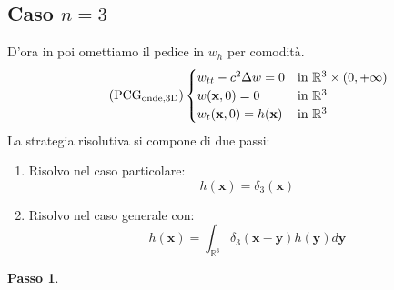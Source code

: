 \documentclass[10pt,a4paper,twoside,openright]{book}
\newcommand{\x}{\mathbf{x}}
\newcommand{\y}{\mathbf{y}}
\begin{document}
\subsection{Caso \texorpdfstring{$n=3$}{n=3}}

D'ora in poi omettiamo il pedice in $\displaystyle w_{h}$ per comodità.
\begin{equation*}
	\tag{PCG$_{\text{onde,3D}}$}
	\begin{cases}
		w_{tt} -c^{2} \Delta w=0            & \text{in} \ \mathbb{R}^{3} \times ( 0,+\infty ) \\
		w(\x ,0) =0                 & \text{in} \ \mathbb{R}^{3}                      \\
		w_{t}(\x ,0) =h(\x) & \text{in} \ \mathbb{R}^{3}                      
	\end{cases}
	\label{eq:pcg-3-onde}
\end{equation*}
La strategia risolutiva si compone di due passi:
\begin{enumerate}
	\item Risolvo nel caso particolare:
		\begin{equation*}
			h(\x) =\delta _{3}(\x)
		\end{equation*}
	\item Risolvo nel caso generale con:
		\begin{equation*}
			h(\x) =\int _{\mathbb{R}^{3}} \delta _{3}(\x -\y) h(\y) d\y
		\end{equation*}
\end{enumerate}



\textbf{Passo 1}.
\end{document}
